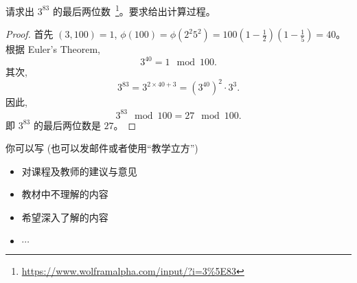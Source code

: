 \documentclass[a4paper, justified]{tufte-handout}
\begin{document}
\begin{problem}
  请求出 $3^{83}$ 的最后两位数~\footnote{\url{https://www.wolframalpha.com/input/?i=3\%5E83}}。要求给出计算过程。
\end{problem}

\begin{proof}
  首先 $(3, 100) = 1$, $\phi(100) = \phi(2^2 5^2) = 100 (1 - \frac{1}{2})(1 - \frac{1}{5}) = 40$。
  根据 Euler's Theorem,
  \[
    3^{40} = 1 \mod{100}.
  \]
  其次,
  \[
    3^{83} = 3^{2 \times 40 + 3} = (3^{40})^{2} \cdot 3^{3}.
  \]
  因此,
  \[
    3^{83} \mod{100} = 27 \mod{100}.
  \]
  即 $3^{83}$ 的最后两位数是 $27$。
\end{proof}

\begincorrection

\beginfb

你可以写 (也可以发邮件或者使用``教学立方'')
\begin{itemize}
  \item 对课程及教师的建议与意见
  \item 教材中不理解的内容
  \item 希望深入了解的内容
  \item $\cdots$
\end{itemize}
\end{document}
